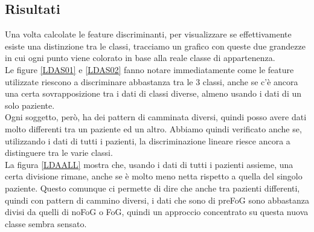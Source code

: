 \subsection{Risultati}
Una volta calcolate le feature discriminanti, per visualizzare se effettivamente esiste una distinzione tra le classi, tracciamo un grafico con queste due grandezze in cui ogni punto viene colorato in base alla reale classe di appartenenza.\\
Le figure \ref{LDAS01} e \ref{LDAS02} fanno notare immediatamente come le feature utilizzate riescono a discriminare abbastanza tra le 3 classi, anche se c'è ancora una certa sovrapposizione tra i dati di classi diverse, almeno usando i dati di un solo paziente.\\
Ogni soggetto, però, ha dei pattern di camminata diversi, quindi posso avere dati molto differenti tra un paziente ed un altro. Abbiamo quindi verificato anche se, utilizzando i dati di tutti i pazienti, la discriminazione lineare riesce ancora a distinguere tra le varie classi.\\
La figura \ref{LDAALL} mostra che, usando i dati di tutti i pazienti assieme, una certa divisione rimane, anche se è molto meno netta rispetto a quella del singolo paziente. Questo comunque ci permette di dire che anche tra pazienti differenti, quindi con pattern di cammino diversi, i dati che sono di preFoG sono abbastanza divisi da quelli di noFoG o FoG, quindi un approccio concentrato su questa nuova classe sembra sensato.

